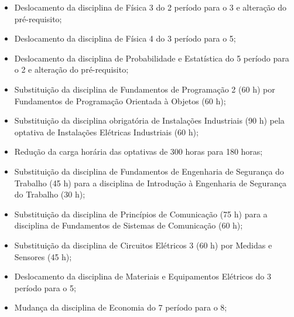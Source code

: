 
\begin{itemize}
	\item Deslocamento da disciplina de Física 3 do 2\textordmasculine{} período para o 3\textordmasculine{}  e alteração do pré-requisito;
	
	\item Deslocamento da disciplina de Física 4 do 3\textordmasculine{} período para o 5\textordmasculine{};
	
	\item Deslocamento da disciplina de Probabilidade e Estatística do 5\textordmasculine{} período para o 2\textordmasculine{} e alteração do pré-requisito;
	
	\item Substituição da disciplina de Fundamentos de Programação 2 (60 h) por Fundamentos de Programação Orientada à Objetos (60 h);
	
	\item Substituição da disciplina obrigatória de Instalações Industriais (90 h) pela optativa de Instalações Elétricas Industriais (60 h);
	
	\item Redução da carga horária das optativas de 300 horas para 180 horas;
	
	\item Substituição da disciplina de Fundamentos de Engenharia de Segurança do Trabalho (45 h) para a disciplina de Introdução à Engenharia de Segurança do Trabalho (30 h);
	
	\item Substituição da disciplina de Princípios de Comunicação (75 h) para a disciplina de Fundamentos de Sistemas de Comunicação (60 h);
	
	\item Substituição da disciplina de Circuitos Elétricos 3 (60 h) por Medidas e Sensores (45 h);
	
	\item Deslocamento da disciplina de Materiais e Equipamentos Elétricos do 3\textordmasculine{} período para o 5\textordmasculine{};
	
	\item Mudança da disciplina de Economia do 7\textordmasculine{} período para o 8\textordmasculine{};
	

\end{itemize}
